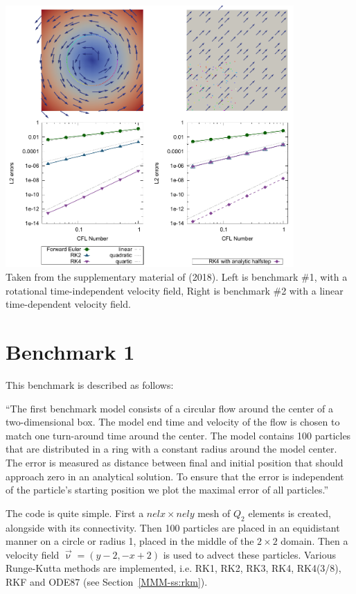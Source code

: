 \begin{center}
\includegraphics[width=11cm]{python_codes/fieldstone_122/images/galh18.png}\\
{\captionfont Taken from the supplementary material of \textcite{galh18} (2018). 
Left is benchmark \#1, with a rotational time-independent velocity field, Right is benchmark \#2
with a linear time-dependent velocity field.}
\end{center}

\section*{Benchmark 1}

This benchmark is described as follows:
\begin{displayquote}
``The first benchmark model consists of a circular flow
around the center of a two-dimensional box. The model
end time and velocity of the flow is chosen to match one
turn-around time around the center. The model contains
100 particles that are distributed in a ring with a constant
radius around the model center. The error is measured as
distance between final and initial position that should approach 
zero in an analytical solution. To ensure that the
error is independent of the particle’s starting position we
plot the maximal error of all particles.''
\end{displayquote}

The code is quite simple. First a $nelx \times nely$ mesh of $Q_2$ elements
is created, alongside with its connectivity.
Then 100 particles are placed in an equidistant manner on a circle or radius 1, placed in
the middle of the $2\times 2$ domain. Then a velocity field $\vec\upnu=(y-2,-x+2)$ is used to 
advect these particles. 
Various Runge-Kutta methods are implemented, i.e. RK1, RK2, RK3, RK4, RK4(3/8), RKF and ODE87 
(see Section~\ref{MMM-ss:rkm}).

